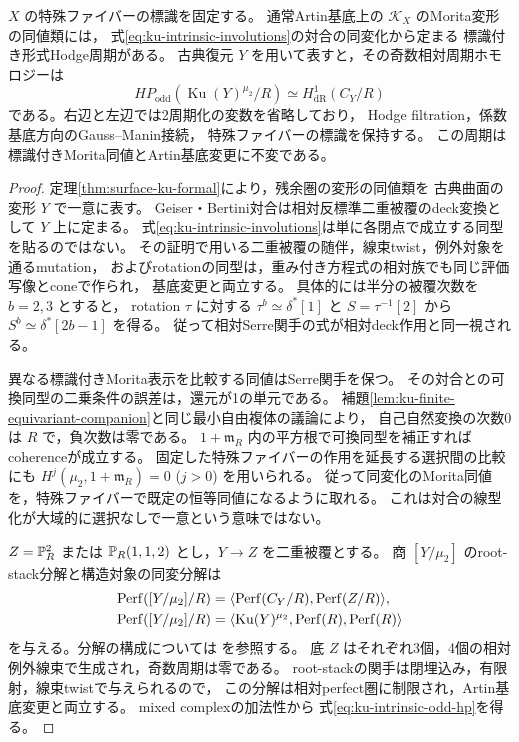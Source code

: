 \begin{lemma}[標識付き同変周期]
\label{lem:ku-intrinsic-involution-period}
$X$ の特殊ファイバーの標識を固定する。
通常Artin基底上の $\mathcal K_X$ のMorita変形の同値類には，
式\eqref{eq:ku-intrinsic-involutions}の対合の同変化から定まる
標識付き形式Hodge周期がある。
古典復元 $Y$ を用いて表すと，その奇数相対周期ホモロジーは
\begin{equation}\label{eq:ku-intrinsic-odd-hp}
 HP_{\mathrm{odd}}(\operatorname{Ku}(Y)^{\mu_2}/R)
 \simeq H^1_{\mathrm{dR}}(C_Y/R)
\end{equation}
である。右辺と左辺では2周期化の変数を省略しており，
Hodge filtration，係数基底方向のGauss--Manin接続，
特殊ファイバーの標識を保持する。
この周期は標識付きMorita同値とArtin基底変更に不変である。
\end{lemma}
\begin{proof}
定理\ref{thm:surface-ku-formal}により，残余圏の変形の同値類を
古典曲面の変形 $Y$ で一意に表す。
Geiser・Bertini対合は相対反標準二重被覆のdeck変換として $Y$ 上に定まる。
式\eqref{eq:ku-intrinsic-involutions}は単に各閉点で成立する同型を貼るのではない。
その証明で用いる二重被覆の随伴，線束twist，例外対象を通るmutation，
およびrotationの同型は，重み付き方程式の相対族でも同じ評価写像とconeで作られ，
基底変更と両立する。
具体的には半分の被覆次数を $b=2,3$ とすると，
rotation $\tau$ に対する $\tau^b\simeq\delta^*[1]$ と
$S=\tau^{-1}[2]$ から $S^b\simeq\delta^*[2b-1]$ を得る。
従って相対Serre関手の式が相対deck作用と同一視される。

異なる標識付きMorita表示を比較する同値はSerre関手を保つ。
その対合との可換同型の二乗条件の誤差は，還元が1の単元である。
補題\ref{lem:ku-finite-equivariant-companion}と同じ最小自由複体の議論により，
自己自然変換の次数0は $R$ で，負次数は零である。
$1+\mathfrak m_R$ 内の平方根で可換同型を補正すればcoherenceが成立する。
固定した特殊ファイバーの作用を延長する選択間の比較にも
$H^j(\mu_2,1+\mathfrak m_R)=0$ ($j>0$) を用いられる。
従って同変化のMorita同値を，特殊ファイバーで既定の恒等同値になるように取れる。
これは対合の線型化が大域的に選択なしで一意という意味ではない。

$Z=\mathbb P^2_R$ または $\mathbb P_R(1,1,2)$ とし，$Y\to Z$ を二重被覆とする。
商 $[Y/\mu_2]$ のroot-stack分解と構造対象の同変分解は
\[
 \begin{aligned}
 \operatorname{Perf}([Y/\mu_2]/R)
   &=\langle\operatorname{Perf}(C_Y/R),\operatorname{Perf}(Z/R)\rangle,\\
 \operatorname{Perf}([Y/\mu_2]/R)
   &=\langle\operatorname{Ku}(Y)^{\mu_2},\operatorname{Perf}(R),\operatorname{Perf}(R)\rangle
 \end{aligned}
\]
を与える。分解の構成については
\cite[Theorem~4.2の証明]{LinRampazzoZhang2026}を参照する。
底 $Z$ はそれぞれ3個，4個の相対例外線束で生成され，奇数周期は零である。
root-stackの関手は閉埋込み，有限射，線束twistで与えられるので，
この分解は相対perfect圏に制限され，Artin基底変更と両立する。
mixed complexの加法性\cite[Theorem~5.2(a)]{KellerDG2006}から
式\eqref{eq:ku-intrinsic-odd-hp}を得る。


\end{proof}
